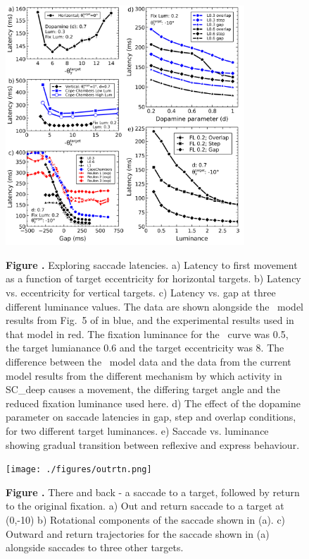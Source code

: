 \documentclass{frontiersSCNS}
\begin{document}
\begin{figure}[t]
\begin{center}
\includegraphics[width=0.8\textwidth]{./figures/lat_vs_everything.png}
\end{center}
\textbf{\label{lat_vs_all} Figure .}
{ Exploring saccade latencies. a) Latency to first movement as a
function of target eccentricity for horizontal targets. b) Latency
vs. eccentricity for vertical targets. c) Latency vs. gap at three
different luminance values. The data are shown alongside
the \ccg~model results from Fig.~5 of \cite{cope_basal_2017} in blue,
and the experimental results used in that model in red. The fixation
luminance for the \ccg~curve was 0.5, the target lumianance 0.6 and
the target eccentricity was 8\dg. The difference between
the \ccg~model data and the data from the current model results from
the different mechanism by which activity in SC\_deep causes a
movement, the differing target angle and the reduced fixation
luminance used here. d) The effect
of the dopamine parameter on saccade latencies in gap, step and
overlap conditions, for two different target luminances.  e) Saccade
vs. luminance showing gradual transition between reflexive and express
behaviour.
}
\end{figure}

\begin{figure}[t]
\begin{center}
\texttt{[image: ./figures/outrtn.png]}
\end{center}
\textbf{\label{outrtn} Figure .}
{ There and back - a saccade to a target, followed by return to the
original fixation. a) Out and return saccade to a target at (0,-10\dg)
b) Rotational components of the saccade shown in (a). c) Outward and
return trajectories for the saccade shown in (a) alongside saccades to
three other targets.}
\end{figure}
\end{document}
